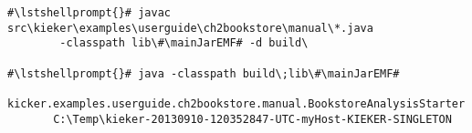\begin{lstlisting}[caption=Commands to compile and run the analysis under Windows,label=lst:bookstoreAnalysisStarterWin]
#\lstshellprompt{}# javac src\kieker\examples\userguide\ch2bookstore\manual\*.java 
        -classpath lib\#\mainJarEMF# -d build\

#\lstshellprompt{}# java -classpath build\;lib\#\mainJarEMF#
       kicker.examples.userguide.ch2bookstore.manual.BookstoreAnalysisStarter 
       C:\Temp\kieker-20130910-120352847-UTC-myHost-KIEKER-SINGLETON
\end{lstlisting}	

